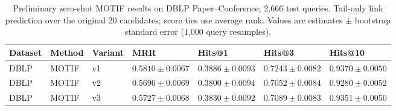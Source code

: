 \begin{table}[htbp]
\centering
\small
\renewcommand{\arraystretch}{1.15}
\setlength{\tabcolsep}{5pt}
\begin{adjustbox}{max width=\linewidth}
\begin{tabular}{|l|l|l|l|l|l|l|}
\hline
\textbf{Dataset} & \textbf{Method} & \textbf{Variant} & \textbf{MRR} & \textbf{Hits@1} & \textbf{Hits@3} & \textbf{Hits@10} \\
\hline
DBLP & MOTIF & v1 & $0.5810 \pm 0.0067$ & $0.3886 \pm 0.0093$ & $0.7243 \pm 0.0082$ & $0.9370 \pm 0.0050$ \\
\hline
DBLP & MOTIF & v2 & $0.5696 \pm 0.0069$ & $0.3800 \pm 0.0094$ & $0.7052 \pm 0.0084$ & $0.9280 \pm 0.0052$ \\
\hline
DBLP & MOTIF & v3 & $0.5727 \pm 0.0068$ & $0.3830 \pm 0.0092$ & $0.7089 \pm 0.0083$ & $0.9351 \pm 0.0050$ \\
\hline
\end{tabular}
\end{adjustbox}
\caption{Preliminary zero-shot MOTIF results on DBLP Paper--Conference; 2,666 test queries. Tail-only link prediction over the original 20 candidates; score ties use average rank. Values are estimates $\pm$ bootstrap standard error (1,000 query resamples).}
\label{tab:motif-dblp-paper-conference-link_prediction}
\end{table}
